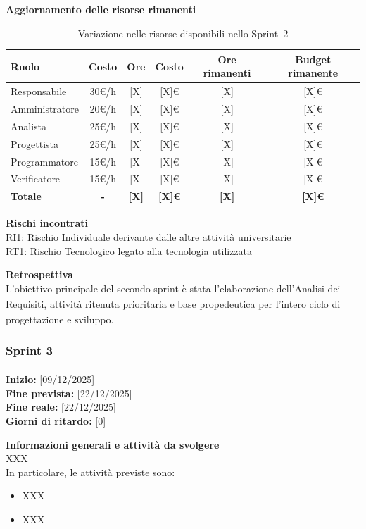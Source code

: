 \documentclass[a4paper,12pt]{article}
\newcommand{\gloss}{\texorpdfstring{\textsubscript{\scalebox{0.6}{\textbf{G}}}}{G}}
\begin{document}
\noindent\textbf{Aggiornamento delle risorse rimanenti}

\begin{table}[H]
\centering
\footnotesize
\begin{tabular}{|l|c|c|c|c|c|}
\hline
Ruolo & Costo & Ore & Costo & Ore rimanenti & Budget rimanente \\
\hline
Responsabile & 30€/h & [X] & [X]€ & [X] & [X]€ \\
\hline
Amministratore & 20€/h & [X] & [X]€ & [X] & [X]€ \\
\hline
Analista & 25€/h & [X] & [X]€ & [X] & [X]€ \\
\hline
Progettista & 25€/h & [X] & [X]€ & [X] & [X]€ \\
\hline
Programmatore & 15€/h & [X] & [X]€ & [X] & [X]€ \\
\hline
Verificatore & 15€/h & [X] & [X]€ & [X] & [X]€ \\
\hline
\textbf{Totale} & \textbf{-} & \textbf{[X]} & \textbf{[X]€} & \textbf{[X]} & \textbf{[X]€} \\
\hline
\end{tabular}
\caption{Variazione nelle risorse disponibili nello Sprint\gloss\ 2}
\label{tab:risorse-sprint2}
\end{table}

\noindent\textbf{Rischi incontrati}\\
RI1: Rischio Individuale derivante dalle altre attività universitarie\\
RT1: Rischio Tecnologico legato alla tecnologia utilizzata

\noindent\textbf{Retrospettiva}\\
L'obiettivo principale del secondo sprint\textsubscript{} è stata l'elaborazione dell'Analisi dei Requisiti\textsubscript{}, attività ritenuta prioritaria e base propedeutica per l'intero ciclo di progettazione e sviluppo.

\subsubsection{Sprint\textsubscript{} 3}

\textbf{Inizio:} [09/12/2025] \\
\textbf{Fine prevista:} [22/12/2025] \\
\textbf{Fine reale:} [22/12/2025] \\
\textbf{Giorni di ritardo:} [0]

\noindent\textbf{Informazioni generali e attività da svolgere}\\
XXX\\
In particolare, le attività previste sono:
\begin{itemize}
    \item XXX
    \item XXX
\end{itemize}
\end{document}
